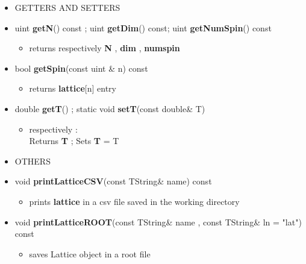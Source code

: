 \documentclass[11pt,a4paper]{article}
\begin{document}
\begin{itemize}
\begin{itemize}
		\item[] 
		GETTERS AND SETTERS \\
					
			\item[] uint \textbf{getN}() const ; uint \textbf{getDim}() const; uint \textbf{getNumSpin}() const 	
			\begin{itemize}
			\item[] returns respectively \textbf{N} , \textbf{dim} , \textbf{num\textunderscore spin} 
			\end{itemize}			
			
			\item[] bool \textbf{getSpin}(const uint \& n) const 		 
			\begin{itemize}
				\item[] returns \textbf{lattice}[n] entry
			\end{itemize}
					
			\item[] double \textbf{getT}() ; static void \textbf{setT}(const double\& \textunderscore T)	
			\begin{itemize}
				\item[] respectively : \\ 
						Returns \textbf{T} ; Sets \textbf{T} = \textunderscore T \\
			\end{itemize}
			
		\item[] 
		OTHERS \\
			
			\item[] void \textbf{printLatticeCSV}(const TString\& name) const		 
			\begin{itemize}
				\item[] prints \textbf{lattice} in a csv file saved in the working directory
			\end{itemize}
			
			\item[] 
			{\small			
			void \textbf{printLatticeROOT}(const TString\& name , const TString\& ln = "lat") const	
			}			
			\begin{itemize}
				\item[] saves Lattice object in a root file 
			\end{itemize}
			
	\end{itemize}

	
\end{itemize}
\end{document}
